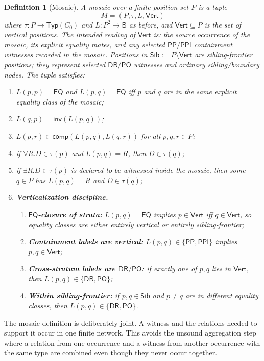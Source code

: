 \documentclass[11pt]{article}
\newtheorem{definition}[theorem]{Definition}
\newcommand{\Base}{\mathsf{B}}
\newcommand{\EQ}{\mathsf{EQ}}
\newcommand{\DR}{\mathsf{DR}}
\newcommand{\PO}{\mathsf{PO}}
\newcommand{\PP}{\mathsf{PP}}
\newcommand{\PPI}{\mathsf{PPI}}
\newcommand{\Inv}{\mathsf{inv}}
\newcommand{\comp}{\mathsf{comp}}
\newcommand{\Typ}{\mathsf{Typ}}
\newcommand{\Vrt}{\mathsf{Vert}}
\newcommand{\Sib}{\mathsf{Sib}}
\begin{document}
\begin{definition}[Mosaic]\label{def:mosaic}
A mosaic over a finite position set $P$ is a tuple
\[
  M=(P,\tau,L,\Vrt)
\]
where $\tau:P\to\Typ(C_0)$ and $L:P^2\to\Base$ as before, and
$\Vrt\subseteq P$ is the set of \emph{vertical} positions.  The
intended reading of $\Vrt$ is: the source occurrence of the mosaic,
its explicit equality mates, and any selected $\PP/\PPI$ containment
witnesses recorded in the mosaic.  Positions in
$\Sib:=P\setminus\Vrt$ are \emph{sibling-frontier} positions; they
represent selected $\DR/\PO$ witnesses and ordinary
sibling/boundary nodes.  The tuple satisfies:
\begin{enumerate}[label=(M\arabic*)]
\item $L(p,p)=\EQ$ and $L(p,q)=\EQ$ iff $p$ and $q$ are in the same explicit equality class of the mosaic;
\item $L(q,p)=\Inv(L(p,q))$;
\item $L(p,r)\in\comp(L(p,q),L(q,r))$ for all $p,q,r\in P$;
\item if $\forall R.D\in\tau(p)$ and $L(p,q)=R$, then $D\in\tau(q)$;
\item if $\exists R.D\in\tau(p)$ is declared to be witnessed inside the mosaic, then some $q\in P$ has $L(p,q)=R$ and $D\in\tau(q)$;
\item \textbf{Verticalization discipline.}
  \begin{enumerate}[label=(\alph*)]
  \item \textbf{$\EQ$-closure of strata:} $L(p,q)=\EQ$ implies $p\in\Vrt$ iff $q\in\Vrt$, so equality classes are either entirely vertical or entirely sibling-frontier;
  \item \textbf{Containment labels are vertical:} $L(p,q)\in\{\PP,\PPI\}$ implies $p,q\in\Vrt$;
  \item \textbf{Cross-stratum labels are $\DR/\PO$:} if exactly one of $p,q$ lies in $\Vrt$, then $L(p,q)\in\{\DR,\PO\}$;
  \item \textbf{Within sibling-frontier:} if $p,q\in\Sib$ and $p\neq q$ are in different equality classes, then $L(p,q)\in\{\DR,\PO\}$.
  \end{enumerate}
\end{enumerate}
\end{definition}

The mosaic definition is deliberately joint.  A witness and the relations needed to support it occur in one finite network.  This avoids the unsound aggregation step where a relation from one occurrence and a witness from another occurrence with the same type are combined even though they never occur together.
\end{document}
